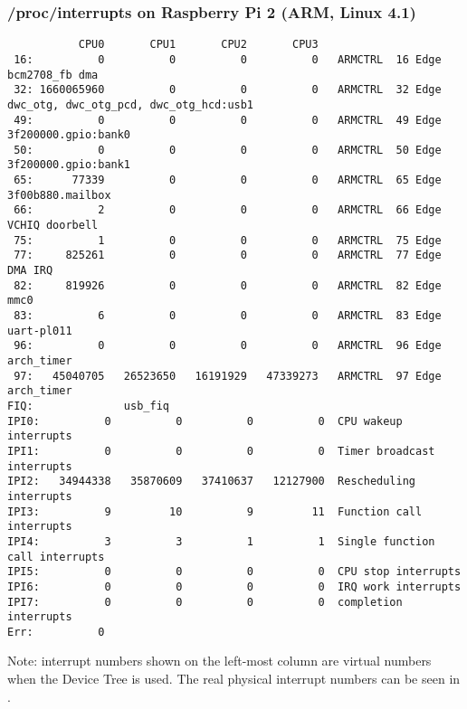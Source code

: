 \begin{frame}[fragile]
  \frametitle{/proc/interrupts on Raspberry Pi 2 (ARM, Linux 4.1)}
\begin{block}{}
  \tiny
\begin{verbatim}
           CPU0       CPU1       CPU2       CPU3
 16:          0          0          0          0   ARMCTRL  16 Edge bcm2708_fb dma
 32: 1660065960          0          0          0   ARMCTRL  32 Edge dwc_otg, dwc_otg_pcd, dwc_otg_hcd:usb1
 49:          0          0          0          0   ARMCTRL  49 Edge 3f200000.gpio:bank0
 50:          0          0          0          0   ARMCTRL  50 Edge 3f200000.gpio:bank1
 65:      77339          0          0          0   ARMCTRL  65 Edge 3f00b880.mailbox
 66:          2          0          0          0   ARMCTRL  66 Edge VCHIQ doorbell
 75:          1          0          0          0   ARMCTRL  75 Edge
 77:     825261          0          0          0   ARMCTRL  77 Edge DMA IRQ
 82:     819926          0          0          0   ARMCTRL  82 Edge mmc0
 83:          6          0          0          0   ARMCTRL  83 Edge uart-pl011
 96:          0          0          0          0   ARMCTRL  96 Edge arch_timer
 97:   45040705   26523650   16191929   47339273   ARMCTRL  97 Edge arch_timer
FIQ:              usb_fiq
IPI0:          0          0          0          0  CPU wakeup interrupts
IPI1:          0          0          0          0  Timer broadcast interrupts
IPI2:   34944338   35870609   37410637   12127900  Rescheduling interrupts
IPI3:          9         10          9         11  Function call interrupts
IPI4:          3          3          1          1  Single function call interrupts
IPI5:          0          0          0          0  CPU stop interrupts
IPI6:          0          0          0          0  IRQ work interrupts
IPI7:          0          0          0          0  completion interrupts
Err:          0

\end{verbatim}
\end{block}
  \footnotesize
  Note: interrupt numbers shown on the left-most column are virtual
  numbers when the Device Tree is used. The real physical interrupt
  numbers can be seen in .
\end{frame}

